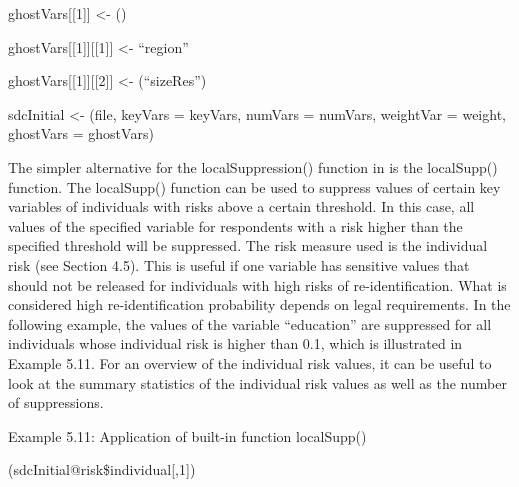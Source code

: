 \documentclass[letterpaper,10pt,english]{sphinxmanual}
\begin{document}
\begin{DUlineblock}{0em}
\item[] 
\item[] ghostVars{[}{[}1{]}{]} \textless{}- ()
\item[] ghostVars{[}{[}1{]}{]}{[}{[}1{]}{]} \textless{}- “region”
\item[] ghostVars{[}{[}1{]}{]}{[}{[}2{]}{]} \textless{}- (“sizeRes”)
\item[] 
\item[] sdcInitial \textless{}- (file, keyVars = keyVars, numVars =
numVars, weightVar = weight, ghostVars = ghostVars)
\end{DUlineblock}

\begin{DUlineblock}{0em}
\item[] 
\item[] 
\end{DUlineblock}

The simpler alternative for the localSuppression() function in
 is the localSupp() function. The localSupp() function can be
used to suppress values of certain key variables of individuals with
risks above a certain threshold. In this case, all values of the
specified variable for respondents with a risk higher than the specified
threshold will be suppressed. The risk measure used is the individual
risk (see Section 4.5). This is useful if one variable has sensitive
values that should not be released for individuals with high risks of
re-identification. What is considered high re-identification probability
depends on legal requirements. In the following example, the values of
the variable “education” are suppressed for all individuals whose
individual risk is higher than 0.1, which is illustrated in Example
5.11. For an overview of the individual risk values, it can be useful to
look at the summary statistics of the individual risk values as well as
the number of suppressions.

Example 5.11: Application of built-in  function localSupp()

\begin{DUlineblock}{0em}
\item[] 
\item[] (sdcInitial@risk\$individual{[},1{]})
\end{DUlineblock}
\end{document}
